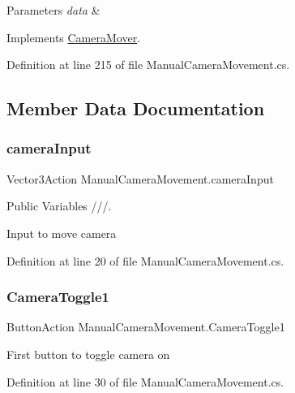 \begin{DoxyParams}{Parameters}
{\em data} & \\
\hline
\end{DoxyParams}


Implements \mbox{\hyperlink{class_camera_mover_ab2f77d1df91324b508a7a45f1f22a04a}{Camera\+Mover}}.



Definition at line 215 of file Manual\+Camera\+Movement.\+cs.



\subsection{Member Data Documentation}
\mbox{\label{class_manual_camera_movement_a9d77f87895d77561f1e2364732e27f73}} 
\subsubsection{\texorpdfstring{camera\+Input}{cameraInput}}
{\footnotesize\ttfamily Vector3\+Action Manual\+Camera\+Movement.\+camera\+Input}



Public Variables ///. 

Input to move camera 

Definition at line 20 of file Manual\+Camera\+Movement.\+cs.

\mbox{\label{class_manual_camera_movement_a8d1d608815cd9a9a8bd8639ac24ef304}} 
\subsubsection{\texorpdfstring{Camera\+Toggle1}{CameraToggle1}}
{\footnotesize\ttfamily Button\+Action Manual\+Camera\+Movement.\+Camera\+Toggle1}



First button to toggle camera on 



Definition at line 30 of file Manual\+Camera\+Movement.\+cs.

